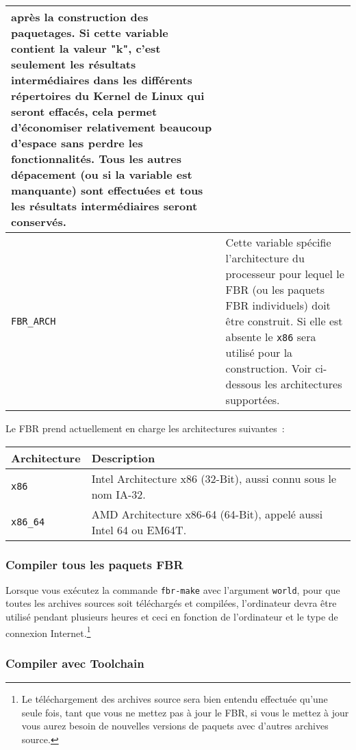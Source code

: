 \begin{longtable}{|l|p{10cm}|}
    après la construction des paquetages. Si cette variable contient la valeur "k",
	c'est seulement les résultats intermédiaires dans les différents répertoires du Kernel
	de Linux qui seront effacés, cela permet d'économiser relativement beaucoup d'espace
	sans perdre les fonctionnalités. Tous les autres dépacement (ou si la variable est
	manquante) sont effectuées et tous les résultats intermédiaires seront conservés. \\
\hline
\texttt{FBR\_ARCH} &
    Cette variable spécifie l'architecture du processeur pour lequel le FBR
    (ou les paquets FBR individuels) doit être construit. Si elle est absente
    le \texttt{x86} sera utilisé pour la construction. Voir ci-dessous les
    architectures supportées. \\
\hline
\end{longtable}

Le FBR prend actuellement en charge les architectures suivantes~:

\begin{longtable}{|l|p{10cm}|}
    \hline
    \multicolumn{1}{|l}{\textbf{Architecture}} &
    \multicolumn{1}{|l|}{\textbf{Description}} \\
    \hline
    \endhead
    \hline
    \endfoot
    \endlastfoot
\texttt{x86} &
    Intel Architecture x86 (32-Bit), aussi connu sous le nom IA-32. \\
\hline
\texttt{x86\_64} &
    AMD Architecture x86-64 (64-Bit), appelé aussi Intel 64 ou EM64T. \\
\hline
\end{longtable}

\subsubsection{Compiler tous les paquets FBR}

Lorsque vous exécutez la commande \texttt{fbr-make} avec l'argument \texttt{world},
pour que toutes les archives sources soit téléchargés et compilées, l'ordinateur
devra être utilisé pendant plusieurs heures et ceci en fonction de l'ordinateur
et le type de connexion Internet.\footnote{Le téléchargement des archives source
sera bien entendu effectuée qu'une seule fois, tant que vous ne mettez pas à
jour le FBR, si vous le mettez à jour vous aurez besoin de nouvelles versions de
paquets avec d'autres archives source.}

\subsubsection{Compiler avec Toolchain}

